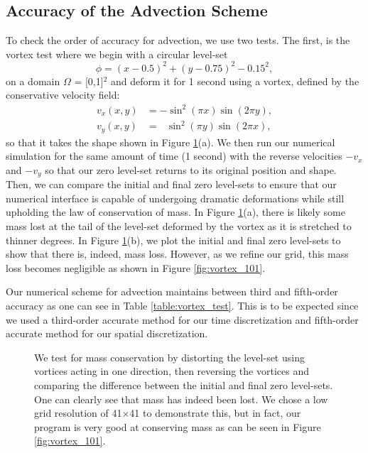 \documentclass[oneside,12pt,final]{/Applications/TeX/packages/ucthesis-CA2012}
\begin{document}
\begin{mainmatter}
\section{Accuracy of the Advection Scheme}

To check the order of accuracy for advection, we use two tests. The first, is the vortex test where we begin with a circular level-set
\begin{equation}
\phi = (x-0.5)^2 + (y-0.75)^2 - 0.15^2,
\end{equation}
on a domain $\Omega$ = [0,1]$^2$ and deform it for 1 second using a vortex, defined by the conservative velocity field:
\begin{equation}
\begin{aligned}
	v_x(x,y) &= -\sin^2(\pi x) \sin(2\pi y),\\
	v_y(x,y)  &= \>\>\>\sin^2(\pi y) \sin(2\pi x),
\end{aligned}	
\end{equation}
so that it takes the shape shown in Figure \ref{fig:vortex_and_overlap}(a). We then run our numerical simulation for the same amount of time (1 second) with the reverse velocities $-v_x$ and $-v_y$ so that our zero level-set returns to its original position and shape. Then, we can compare the initial and final zero level-sets to ensure that our numerical interface is capable of undergoing dramatic deformations while still upholding the law of conservation of mass. In Figure \ref{fig:vortex_and_overlap}(a), there is likely some mass lost at the tail of the level-set deformed by the vortex as it is stretched to thinner degrees. In Figure \ref{fig:vortex_and_overlap}(b), we plot the initial and final zero level-sets to show that there is, indeed, mass loss. However, as we refine our grid, this mass loss becomes negligible as shown in Figure \ref{fig:vortex_101}.

Our numerical scheme for advection maintains between third and fifth-order accuracy as one can see in Table \ref{table:vortex_test}. This is to be expected since we used a third-order accurate method for our time discretization and fifth-order accurate method for our spatial discretization.

\begin{figure}
\centering
{} \quad
{}
\caption[Advection Vortex Test]{We test for mass conservation by distorting the level-set using vortices acting in one direction, then reversing the vortices and comparing the difference between the initial and final zero level-sets. One can clearly see that mass has indeed been lost. We chose a low grid resolution of 41$\times$41 to demonstrate this, but in fact, our program is very good at conserving mass as can be seen in Figure \ref{fig:vortex_101}.}
\label{fig:vortex_and_overlap}
\end{figure}


\end{mainmatter}
\end{document}
